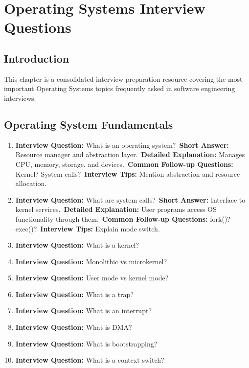 \chapter{Operating Systems Interview Questions}

\section{Introduction}

This chapter is a consolidated interview-preparation resource covering the most important Operating Systems topics frequently asked in software engineering interviews.

\section{Operating System Fundamentals}

\begin{enumerate}
\item \textbf{Interview Question:} What is an operating system?\
\textbf{Short Answer:} Resource manager and abstraction layer.\
\textbf{Detailed Explanation:} Manages CPU, memory, storage, and devices.\
\textbf{Common Follow-up Questions:} Kernel? System calls?\
\textbf{Interview Tips:} Mention abstraction and resource allocation.

\item \textbf{Interview Question:} What are system calls?\
\textbf{Short Answer:} Interface to kernel services.\
\textbf{Detailed Explanation:} User programs access OS functionality through them.\
\textbf{Common Follow-up Questions:} fork()? exec()?\
\textbf{Interview Tips:} Explain mode switch.

\item \textbf{Interview Question:} What is a kernel?
\item \textbf{Interview Question:} Monolithic vs microkernel?
\item \textbf{Interview Question:} User mode vs kernel mode?
\item \textbf{Interview Question:} What is a trap?
\item \textbf{Interview Question:} What is an interrupt?
\item \textbf{Interview Question:} What is DMA?
\item \textbf{Interview Question:} What is bootstrapping?
\item \textbf{Interview Question:} What is a context switch?
\end{enumerate}

